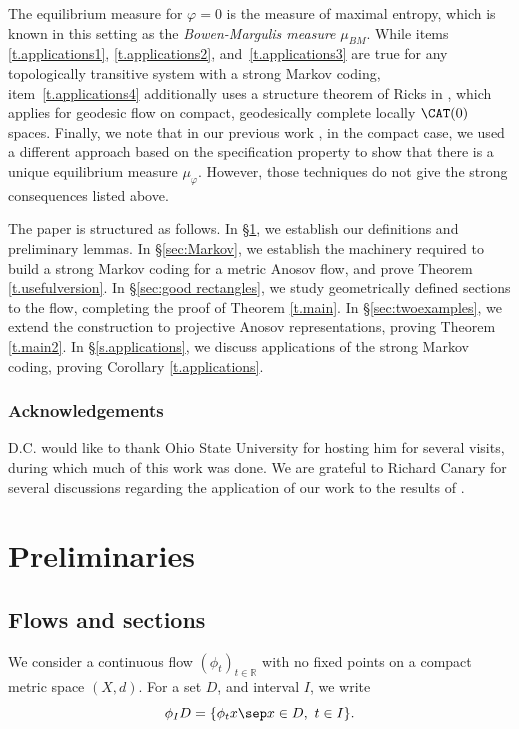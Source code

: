 The equilibrium measure for $\varphi=0$ is the measure of maximal entropy, which is known in this setting as the \emph{Bowen-Margulis measure} $\mu_{BM}$. While items \eqref{t.applications1}, \eqref{t.applications2}, and~\eqref{t.applications3} are true for any topologically transitive system with a strong Markov coding, item~\eqref{t.applications4} additionally uses a structure theorem of Ricks in \cite{ricks}, which applies for geodesic flow on compact, geodesically complete locally $\CAT(0)$ spaces. Finally, we note that in our previous work \cite{CLT}, in the compact case, we used a different approach based on the specification property to show that there is a unique equilibrium measure $\mu_\varphi$. However, those techniques do not give the strong consequences listed above.

The paper is structured as follows. In \S \ref{sec:background}, we establish our definitions and preliminary lemmas. In \S \ref{sec:Markov}, we establish the machinery required to build a strong Markov coding for a metric Anosov flow, and prove Theorem \ref{t.usefulversion}. In \S\ref{sec:good rectangles}, we study geometrically defined sections to the flow, completing the proof of Theorem \ref{t.main}. In \S \ref{sec:twoexamples}, we extend the construction to projective Anosov representations, proving Theorem \ref{t.main2}. In \S \ref{s.applications}, we discuss applications of the strong Markov coding, proving Corollary \ref{t.applications}.

\subsubsection*{Acknowledgements}
D.C. would like to thank Ohio State University for hosting him for several visits, during which much of this work was done. We are grateful to Richard Canary for several discussions regarding the application of our work to the results of \cite{bcls}.

\section{Preliminaries}\label{sec:background}

\subsection{Flows and sections}

We consider a continuous flow $(\phi_t)_{t \in \mathbb R}$ with no fixed points on a compact metric space $(X, d)$. For a set $D$, and interval $I$, we write
\[ \phi_I D = \{\phi_t x \sep x \in D, \ t \in I\}. \]

